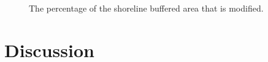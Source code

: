 \documentclass[12pt]{article}\usepackage[]{graphicx}\usepackage[]{color}
\begin{document}
\begin{figure}[H]

{\centering {} 

}

\caption{The percentage of the shoreline buffered area that is modified.}\label{fig:percentmod}
\end{figure}
\hypertarget{discussion}{%
\section{Discussion}\label{discussion}}
\end{document}
